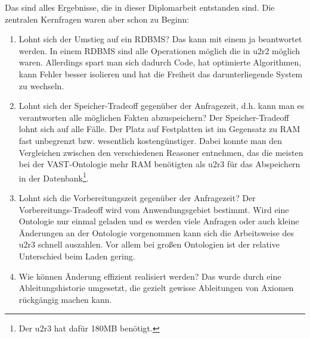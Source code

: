 Das sind alles Ergebnisse, die in dieser Diplomarbeit entstanden sind. Die zentralen Kernfragen waren aber schon zu Beginn:
\begin{enumerate}
  \item Lohnt sich der Umstieg auf ein RDBMS? Das kann mit einem ja beantwortet werden. In einem RDBMS sind alle Operationen möglich die in u2r2 möglich waren. Allerdings spart man sich dadurch Code, hat optimierte Algorithmen, kann Fehler besser isolieren und hat die Freiheit das darunterliegende System zu wechseln.
  \item Lohnt sich der Speicher-Tradeoff gegenüber der Anfragezeit, d.h. kann man es verantworten alle möglichen Fakten abzuspeichern? Der Speicher-Tradeoff lohnt sich auf alle Fälle. Der Platz auf Festplatten ist im Gegensatz zu RAM fast unbegrenzt bzw. wesentlich kostengünstiger. Dabei konnte man den Vergleichen zwischen den verschiedenen Reasoner entnehmen, das die meisten bei der VAST-Ontologie mehr RAM benötigten als u2r3 für das Abspeichern in der Datenbank\footnote{Der u2r3 hat dafür 180MB benötigt.}.
  \item Lohnt sich die Vorbereitungszeit gegenüber der Anfragezeit? Der Vorbereitungs-Tradeoff wird vom Anwendungsgebiet bestimmt. Wird eine Ontologie nur einmal geladen und es werden viele Anfragen oder auch kleine Änderungen an der Ontologie vorgenommen kann sich die Arbeitsweise des u2r3 schnell auszahlen. Vor allem bei großen Ontologien ist der relative Unterschied beim Laden gering.
  \item Wie können Änderung effizient realisiert werden? Das wurde durch eine Ableitungshistorie umgesetzt, die gezielt gewisse Ableitungen von Axiomen rückgängig machen kann.
\end{enumerate}
